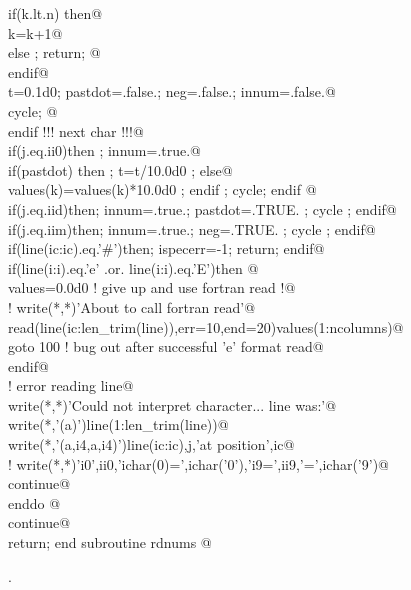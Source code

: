 \documentclass[10pt,a4paper,notitlepage]{article}
\begin{document}
\begin{flushleft}
\begin{minipage}{\linewidth}
\begin{list}{}{}
\mbox{}\verb@          if(k.lt.n) then@\\
\mbox{}\verb@              k=k+1@\\
\mbox{}\verb@          else ; return; @\\
\mbox{}\verb@          endif@\\
\mbox{}\verb@          t=0.1d0; pastdot=.false.; neg=.false.; innum=.false.@\\
\mbox{}\verb@            cycle; @\\
\mbox{}\verb@        endif        !!! next char !!!@\\
\mbox{}\verb@        if(j.eq.ii0)then ; innum=.true.@\\
\mbox{}\verb@          if(pastdot) then ; t=t/10.0d0 ; else@\\
\mbox{}\verb@            values(k)=values(k)*10.0d0 ; endif ; cycle; endif @\\
\mbox{}\verb@        if(j.eq.iid)then; innum=.true.; pastdot=.TRUE. ; cycle ; endif@\\
\mbox{}\verb@        if(j.eq.iim)then; innum=.true.; neg=.TRUE. ; cycle ; endif@\\
\mbox{}\verb@        if(line(ic:ic).eq.'#')then; ispecerr=-1; return; endif@\\
\mbox{}\verb@        if(line(i:i).eq.'e' .or. line(i:i).eq.'E')then @\\
\mbox{}\verb@         values=0.0d0         ! give up and use fortran read !@\\
\mbox{}\verb@!         write(*,*)'About to call fortran read'@\\
\mbox{}\verb@         read(line(ic:len_trim(line)),err=10,end=20)values(1:ncolumns)@\\
\mbox{}\verb@         goto 100 ! bug out after successful 'e' format read@\\
\mbox{}\verb@        endif@\\
\mbox{}\verb@! error reading line@\\
\mbox{}\verb@        write(*,*)'Could not interpret character... line was:'@\\
\mbox{}\verb@        write(*,'(a)')line(1:len_trim(line))@\\
\mbox{}\verb@        write(*,'(a,i4,a,i4)')line(ic:ic),j,'at position',ic@\\
\mbox{}\verb@!        write(*,*)'i0',ii0,'ichar(0)=',ichar('0'),'i9=',ii9,'=',ichar('9')@\\
\mbox{}      continue@\\
\mbox{}\verb@        enddo @\\
\mbox{}      continue@\\
\mbox{}     return; end subroutine rdnums @{\NWsep}
\end{list}
\vspace{-1.5ex}
\footnotesize
\begin{list}{}{\setlength{\itemsep}{-\parsep}\setlength{\itemindent}{-\leftmargin}}
\item {\NWtxtMacroNoRef}.


\end{list}
\end{minipage}
\end{flushleft}
\end{document}
